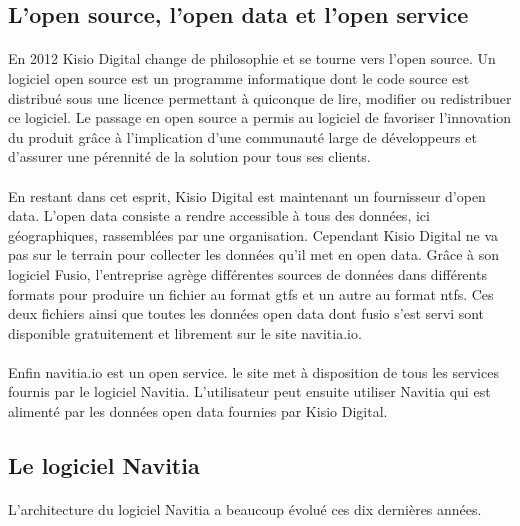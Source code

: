 \documentclass[a4paper]{report}
\begin{document}
\subsection{L'open source, l'open data et l'open service}

\paragraph{} En 2012 Kisio Digital change de philosophie et se tourne vers l'open source. Un logiciel open source est un programme informatique dont le code source est distribué sous une licence permettant à quiconque de lire, modifier ou redistribuer ce logiciel. Le passage en open source a permis au logiciel de favoriser l’innovation du produit grâce à l’implication d’une communauté large de développeurs et d'assurer une pérennité de la solution pour tous ses clients. 

\paragraph{} En restant dans cet esprit, Kisio Digital est maintenant un fournisseur d'open data. L'open data consiste a rendre accessible à tous des données, ici géographiques, rassemblées par une organisation. Cependant Kisio Digital ne va pas sur le terrain pour collecter les données qu'il met en open data. Grâce à son logiciel Fusio, l'entreprise agrège différentes sources de données dans différents formats pour produire un fichier au format gtfs et un autre au format ntfs. Ces deux fichiers ainsi que toutes les données open data dont fusio s'est servi sont disponible gratuitement et librement sur le site navitia.io.

\paragraph{} Enfin navitia.io est un open service. le site met à disposition de tous les services fournis par le logiciel Navitia. L'utilisateur peut ensuite utiliser Navitia qui est alimenté par les données open data fournies par Kisio Digital. 

\subsection{Le logiciel Navitia}

\paragraph{} L'architecture du logiciel Navitia a beaucoup évolué ces dix dernières années.
\end{document}
